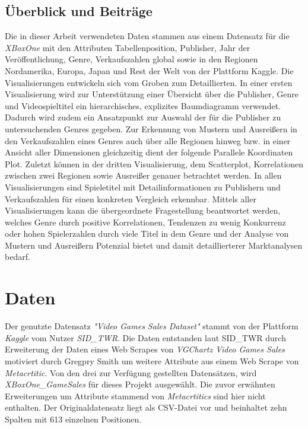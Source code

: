 \documentclass[usegeometry=true]{scrartcl}
\begin{document}
\subsection{Überblick und Beiträge}
Die in dieser Arbeit verwendeten Daten stammen aus einem Datensatz für die \textit{XBoxOne} mit den Attributen Tabellenposition, Publisher, Jahr der Veröffentlichung, Genre, Verkaufszahlen global sowie in den Regionen Nordamerika, Europa, Japan und Rest der Welt von der Plattform Kaggle.\cite{SID_TWR.} 
Die Visualisierungen entwickeln sich vom Groben zum Detaillierten.
In einer ersten Visualisierung wird zur Unterstützung einer Übersicht über die Publisher, Genre und Videospieltitel ein hierarchisches, explizites Baumdiagramm verwendet. 
Dadurch wird zudem ein Ansatzpunkt zur Auswahl der für die Publisher zu untersuchenden Genres gegeben.
Zur Erkennung von Mustern und Ausreißern in den Verkaufszahlen eines Genres auch über alle Regionen hinweg bzw. in einer Ansicht aller Dimensionen gleichzeitig dient der folgende Parallele Koordinaten Plot.
Zuletzt können in der dritten Visualisierung, dem Scatterplot, Korrelationen zwischen zwei Regionen sowie Ausreißer genauer betrachtet werden.
In allen Visualisierungen sind Spieletitel mit Detailinformationen zu Publishern und Verkaufszahlen für einen konkreten Vergleich erkennbar.
Mittels aller Visualisierungen kann die übergeordnete Fragestellung beantwortet werden, welches Genre durch positive Korrelationen, Tendenzen zu wenig Konkurrenz oder hohen Spielerzahlen durch viele Titel in dem Genre und der Analyse von Mustern und Ausreißern Potenzial bietet und damit detaillierterer Marktanalysen bedarf.

\section{Daten}
Der genutzte Datensatz \textit{"Video Games Sales Dataset"} stammt von der Plattform \textit{Kaggle} vom Nutzer \textit{SID\_TWR}.\cite{SID_TWR.} 
Die Daten entstanden laut SID\_TWR durch Erweiterung der Daten eines Web Scrapes von \textit{VGChartz Video Games Sales} motiviert durch Gregpry Smith um weitere Attribute aus einem Web Scrape von \textit{Metacrtitic}.  
Von den drei zur Verfügung gestellten Datensätzen, wird \textit{XBoxOne\_GameSales} für dieses Projekt ausgewählt. 
Die zuvor erwähnten Erweiterungen um Attribute stammend von \textit{Metacrtitics} sind hier nicht enthalten. 
Der Originaldatensatz liegt als CSV-Datei vor und beinhaltet zehn Spalten mit 613 einzelnen Positionen. 
\end{document}
